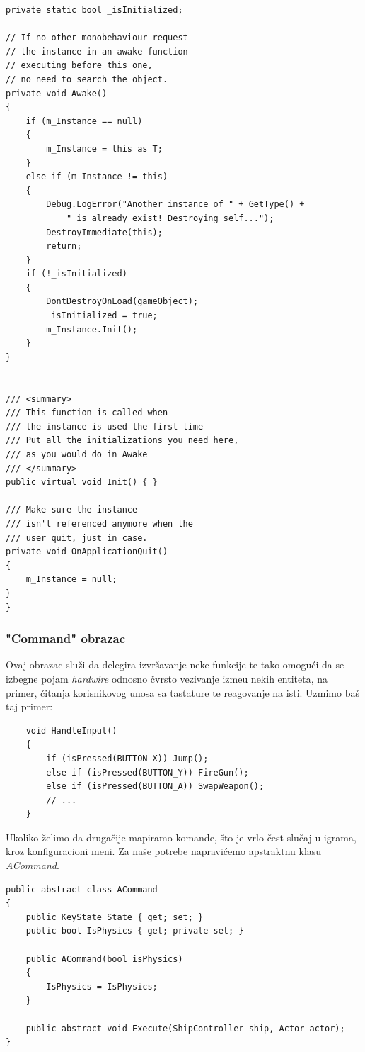 \begin{verbatim}
private static bool _isInitialized;

// If no other monobehaviour request 
// the instance in an awake function
// executing before this one, 
// no need to search the object.
private void Awake()
{
    if (m_Instance == null)
    {
        m_Instance = this as T;
    }
    else if (m_Instance != this)
    {
        Debug.LogError("Another instance of " + GetType() + 
            " is already exist! Destroying self...");
        DestroyImmediate(this);
        return;
    }
    if (!_isInitialized)
    {
        DontDestroyOnLoad(gameObject);
        _isInitialized = true;
        m_Instance.Init();
    }
}


/// <summary>
/// This function is called when 
/// the instance is used the first time
/// Put all the initializations you need here,
/// as you would do in Awake
/// </summary>
public virtual void Init() { }

/// Make sure the instance 
/// isn't referenced anymore when the 
/// user quit, just in case.
private void OnApplicationQuit()
{
    m_Instance = null;
}
}
\end{verbatim}

\subsubsection{"Command" obrazac}
Ovaj obrazac slu\v{z}i da delegira izvr\v{s}avanje neke funkcije te tako omogu\'ci da se izbegne 
pojam \emph{hardwire} odnosno \v{c}vrsto vezivanje izme\dj u nekih entiteta, na primer, \v{c}itanja 
korisnikovog unosa sa tastature te reagovanje na isti. Uzmimo ba\v{s} taj primer:

\begin{verbatim}
    void HandleInput()
    {
        if (isPressed(BUTTON_X)) Jump();
        else if (isPressed(BUTTON_Y)) FireGun();
        else if (isPressed(BUTTON_A)) SwapWeapon();
        // ...
    }
\end{verbatim}

Ukoliko \v{z}elimo da druga\v{c}ije mapiramo komande, \v{s}to je vrlo \v{c}est slu\v{c}aj u igrama, 
kroz konfiguracioni meni. Za na\v{s}e potrebe napravi\'cemo apstraktnu klasu \emph{ACommand}.

\begin{verbatim}
public abstract class ACommand
{
    public KeyState State { get; set; }
    public bool IsPhysics { get; private set; }

    public ACommand(bool isPhysics)
    {
        IsPhysics = IsPhysics;
    }

    public abstract void Execute(ShipController ship, Actor actor);
}
\end{verbatim}

